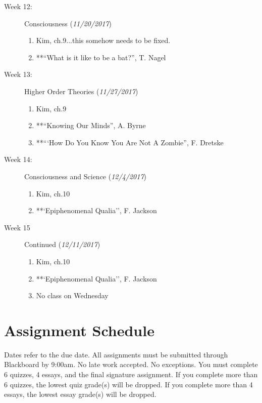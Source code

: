 \documentclass[article,oneside]{memoir}
\begin{document}
\begin{description}
\item[Week 12:] Consciousness (\emph{11/20/2017})
\begin{enumerate}
\item Kim, ch.9...this somehow needs to be fixed. 
\item **``What is it like to be a bat?'', T. Nagel
\end{enumerate}

\item[Week 13:] Higher Order Theories (\emph{11/27/2017})
\begin{enumerate}
\item Kim, ch.9
\item**``Knowing Our Minds'', A. Byrne
\item **``‘How Do You Know You Are Not A Zombie'', F. Dretske 
\end{enumerate}

\item[Week 14:] Consciousness and Science (\emph{12/4/2017})
\begin{enumerate}
\item Kim, ch.10
\item**`Epiphenomenal Qualia'', F. Jackson 
\end{enumerate}


\item[Week 15]  Continued  (\emph{12/11/2017})
\begin{enumerate}
\item  Kim, ch.10
\item**`Epiphenomenal Qualia'', F. Jackson 
\item No class on Wednesday
\end{enumerate}



\end{description}





\section{ Assignment Schedule}
Dates refer to the due date. All assignments must be submitted through Blackboard by 9:00am. No late work accepted. No exceptions. You must complete 6 quizzes, 4 essays, and the final signature assignment.  If you complete more than 6 quizzes, the lowest quiz grade(s) will be dropped. If you complete more than 4 essays, the lowest essay grade(s) will be dropped. 
\end{document}
